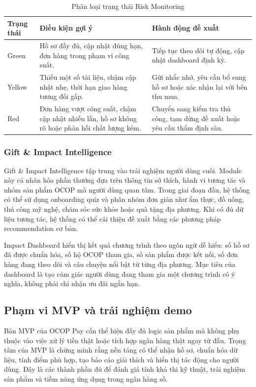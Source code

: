 \documentclass[13pt,a4paper]{extarticle}
\begin{document}
\begin{table}[H]
\centering
\caption{Phân loại trạng thái Risk Monitoring}
\begin{tabular}{|l|p{5cm}|p{5cm}|}
\hline
\textbf{Trạng thái} & \textbf{Điều kiện gợi ý} & \textbf{Hành động đề xuất} \\
\hline
Green & Hồ sơ đầy đủ, cập nhật đúng hạn, đơn hàng trong phạm vi công suất. & Tiếp tục theo dõi tự động, cập nhật dashboard định kỳ. \\
\hline
Yellow & Thiếu một số tài liệu, chậm cập nhật nhẹ, thời hạn giao hàng tương đối gấp. & Gửi nhắc nhở, yêu cầu bổ sung hồ sơ hoặc xác nhận lại với bên thu mua. \\
\hline
Red & Đơn hàng vượt công suất, chậm cập nhật nhiều lần, hồ sơ không rõ hoặc phản hồi chất lượng kém. & Chuyển sang kiểm tra thủ công, tạm dừng đề xuất hoặc yêu cầu thẩm định sâu. \\
\hline
\end{tabular}
\end{table}

\subsubsection{Gift \& Impact Intelligence}

Gift \& Impact Intelligence tập trung vào trải nghiệm người dùng cuối. Module này cá nhân hóa phần thưởng dựa trên thông tin sở thích, hành vi tương tác và nhóm sản phẩm OCOP mà người dùng quan tâm. Trong giai đoạn đầu, hệ thống có thể sử dụng onboarding quiz và phân nhóm đơn giản như ẩm thực, đồ uống, thủ công mỹ nghệ, chăm sóc sức khỏe hoặc quà tặng địa phương. Khi có đủ dữ liệu tương tác, hệ thống có thể cải thiện đề xuất bằng các phương pháp recommendation cơ bản.

Impact Dashboard hiển thị kết quả chương trình theo ngôn ngữ dễ hiểu: số hồ sơ đã được chuẩn hóa, số hộ OCOP tham gia, số sản phẩm được kết nối, số đơn hàng đang theo dõi và câu chuyện nổi bật từ từng địa phương. Mục tiêu của dashboard là tạo cảm giác người dùng đang tham gia một chương trình có ý nghĩa, không phải chỉ nhận ưu đãi ngắn hạn.


\subsection{Phạm vi MVP và trải nghiệm demo}

Bản MVP của OCOP Pay cần thể hiện đầy đủ logic sản phẩm mà không phụ thuộc vào việc xử lý tiền thật hoặc tích hợp ngân hàng thật ngay từ đầu. Trọng tâm của MVP là chứng minh rằng nền tảng có thể nhận hồ sơ, chuẩn hóa dữ liệu, tính điểm phù hợp, tạo báo cáo giải thích và hiển thị tác động cho người dùng. Đây là các thành phần đủ để đánh giá tính khả thi kỹ thuật, trải nghiệm sản phẩm và tiềm năng ứng dụng trong ngân hàng số.
\end{document}
